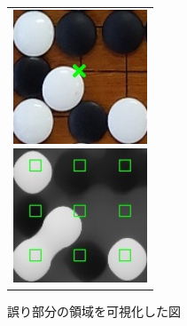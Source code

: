 \documentclass[summary]{nitocs}
\numberwithin{equation}{section}
\begin{document}

            \begin{figure}[tb] %
                \begin{center}
                  \begin{tabular}{c}
                    \begin{minipage}{0.5\hsize}
                      \begin{center}
                        \includegraphics[clip,width=40mm]{DSC_0099/TRIM_resultCompare.jpg}
                    \caption{事例2の誤り部分}
                    \label{ex2_error}
                      \end{center}
                    \end{minipage}
                    \begin{minipage}{0.5\hsize}
                      \begin{center}
                        \includegraphics[clip,width=40mm]{DSC_0099/TRIM_boardWithAreaImg.jpg}
                    \caption{誤り部分の領域を可視化した図}
                    \label{ex2_error_area}
                      \end{center}
                    \end{minipage}
                  \end{tabular}
                \end{center}
            \end{figure}
\end{document}
